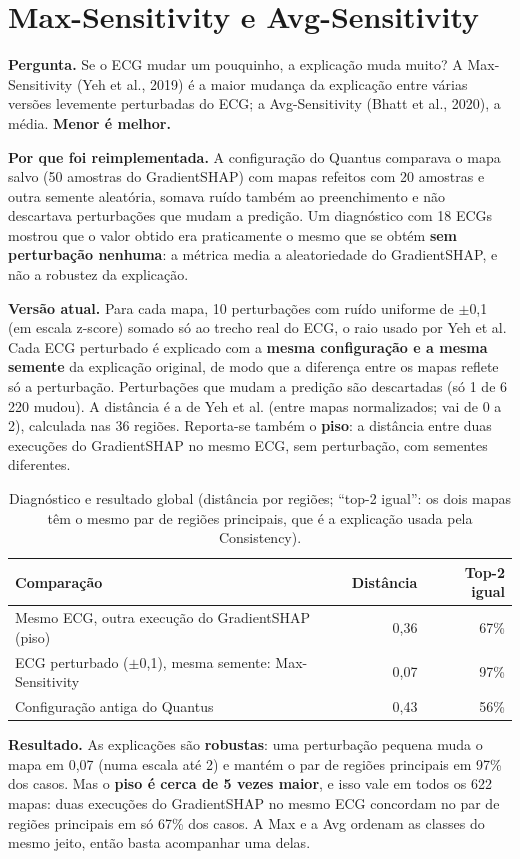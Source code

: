 \documentclass[11pt,a4paper]{article}
\begin{document}
\section{Max-Sensitivity e Avg-Sensitivity}
\textbf{Pergunta.} Se o ECG mudar um pouquinho, a explicação muda muito? A Max-Sensitivity (Yeh et al., 2019) é a maior mudança da explicação entre várias versões levemente perturbadas do ECG; a Avg-Sensitivity (Bhatt et al., 2020), a média. \textbf{Menor é melhor.}

\textbf{Por que foi reimplementada.} A configuração do Quantus comparava o mapa salvo (50 amostras do GradientSHAP) com mapas refeitos com 20 amostras e outra semente aleatória, somava ruído também ao preenchimento e não descartava perturbações que mudam a predição. Um diagnóstico com 18 ECGs mostrou que o valor obtido era praticamente o mesmo que se obtém \textbf{sem perturbação nenhuma}: a métrica media a aleatoriedade do GradientSHAP, e não a robustez da explicação.

\textbf{Versão atual.} Para cada mapa, 10 perturbações com ruído uniforme de $\pm$0,1 (em escala z-score) somado só ao trecho real do ECG, o raio usado por Yeh et al. Cada ECG perturbado é explicado com a \textbf{mesma configuração e a mesma semente} da explicação original, de modo que a diferença entre os mapas reflete só a perturbação. Perturbações que mudam a predição são descartadas (só 1 de 6\,220 mudou). A distância é a de Yeh et al. (entre mapas normalizados; vai de 0 a 2), calculada nas 36 regiões. Reporta-se também o \textbf{piso}: a distância entre duas execuções do GradientSHAP no mesmo ECG, sem perturbação, com sementes diferentes.

\begin{table}[H]
\centering
\small
\caption{Diagnóstico e resultado global (distância por regiões; “top-2 igual”: os dois mapas têm o mesmo par de regiões principais, que é a explicação usada pela Consistency).}
\begin{tabular}{lrr}
\toprule
\textbf{Comparação} & \textbf{Distância} & \textbf{Top-2 igual} \\
\midrule
Mesmo ECG, outra execução do GradientSHAP (piso) & 0,36 & 67\% \\
ECG perturbado ($\pm$0,1), mesma semente: Max-Sensitivity & 0,07 & 97\% \\
Configuração antiga do Quantus & 0,43 & 56\% \\
\bottomrule
\end{tabular}
\end{table}
\textbf{Resultado.} As explicações são \textbf{robustas}: uma perturbação pequena muda o mapa em 0,07 (numa escala até 2) e mantém o par de regiões principais em 97\% dos casos. Mas o \textbf{piso é cerca de 5 vezes maior}, e isso vale em todos os 622 mapas: duas execuções do GradientSHAP no mesmo ECG concordam no par de regiões principais em só 67\% dos casos. A Max e a Avg ordenam as classes do mesmo jeito, então basta acompanhar uma delas.
\end{document}
